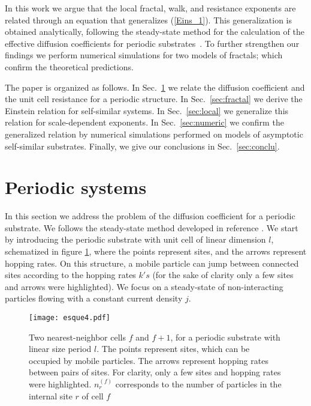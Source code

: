 \documentclass[12pt]{iopart}
\begin{document}
In this work we argue that the local
fractal, walk, and resistance exponents are related through an equation 
that generalizes (\ref{Eins_1}).  This generalization is obtained 
analytically, following the steady-state method for the calculation 
of the effective diffusion coefficients for periodic
substrates~\cite{Aldao_1996}. To further strengthen our findings
we perform numerical simulations for two models of fractals; which
confirm the theoretical predictions. 

The paper is organized as follows. In Sec.~\ref{sec:perio} we relate
the diffusion coefficient and the unit cell resistance  for a periodic structure. In Sec.~\ref{sec:fractal} we derive the Einstein relation for self-similar systems. In
Sec.~\ref{sec:local} we generalize this relation for scale-dependent exponents.
In Sec.~\ref{sec:numeric} we confirm the generalized relation by numerical simulations
performed on models of asymptotic self-similar substrates. Finally, 
we give our conclusions in Sec.~\ref{sec:conclu}.

\section{Periodic systems}\label{sec:perio}

In this section we address the problem of the diffusion coefficient for
a periodic substrate. We follows the steady-state method developed in
reference \cite{Aldao_1996}. 
We start by introducing the periodic substrate  with  unit cell 
of linear dimension $l$, schematized in
figure \ref{cells}, where the points represent sites, and
the arrows 
represent hopping rates. On this structure, a mobile
particle can jump between connected sites according to the hopping rates $k's$ (for the sake of clarity only a few sites and arrows were highlighted).
We focus on a steady-state of non-interacting particles flowing  
with a constant current density $j$. 

\begin{figure}[!ht]
	\begin{center}
\texttt{[image: esque4.pdf]}
 \end{center}
	\caption{Two nearest-neighbor cells $f$ and $f+1$, for a
        periodic substrate with linear size period $l$.  The
        points represent
        sites, which can be occupied by mobile particles.
        The arrows represent hopping rates between pairs of sites. For clarity,
        only a few sites and hopping rates were highlighted.
        $n_r^{(f)}$ corresponds to the number of particles in the
        internal site $r$ of cell $f$
	}
\label{cells}
\end{figure}
\end{document}
